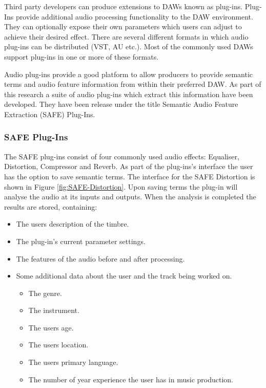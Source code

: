 			Third party developers can produce extensions to DAWs known as plug-ins. Plug-Ins provide additional
			audio processing functionality to the DAW environment. They can optionally expose their own
			parameters which users can adjust to achieve their desired effect. There are several different
			formats in which audio plug-ins can be distributed (VST, AU etc.). Most of the commonly used DAWs
			support plug-ins in one or more of these formats.

			Audio plug-ins provide a good platform to allow producers to provide semantic terms and audio
			feature information from within their preferred DAW. As part of this research a suite of audio
			plug-ins which extract this information have been developed. They have been release under the title
			Semantic Audio Feature Extraction (SAFE) Plug-Ins.

		\subsubsection{SAFE Plug-Ins}
			The SAFE plug-ins consist of four commonly used audio effects: Equaliser, Distortion, Compressor and
			Reverb. As part of the plug-ins's interface the user has the option to save semantic terms. The
			interface for the SAFE Distortion is shown in Figure \ref{fig:SAFE-Distortion}. Upon saving terms
			the plug-in will analyse the audio at its inputs and outputs. When the analysis is completed the
			results are stored, containing:

			\begin{itemize}
				\item The users description of the timbre.
				\item The plug-in's current parameter settings.
				\item The features of the audio before and after processing.
				\item Some additional data about the user and the track being worked on.
				\begin{itemize}
					\item The genre.
					\item The instrument.
					\item The users age.
					\item The users location.
					\item The users primary language.
					\item The number of year experience the user has in music production.
				\end{itemize}
			\end{itemize}

